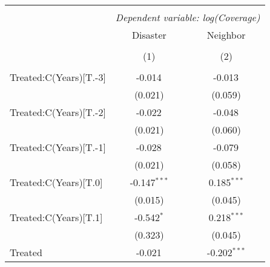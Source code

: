 
\begin{tabular}{@{\extracolsep{5pt}}lcc}
    \\[-1.8ex]\hline
    \hline                                                                                                           \\[-1.8ex]
                           & \multicolumn{2}{c}{\textit{Dependent variable: log(Coverage)}} \
    \cr \cline{2-3}
    \\[-1.8ex] & \multicolumn{1}{c}{Disaster} & \multicolumn{1}{c}{Neighbor}  \\
    \\[-1.8ex] & (1) & (2) \\
    \hline                                                                                                           \\[-1.8ex]
    Treated:C(Years)[T.-3] & -0.014$^{}$                                                          & -0.013$^{}$      \\
                           & (0.021)                                                              & (0.059)          \\
    Treated:C(Years)[T.-2] & -0.022$^{}$                                                          & -0.048$^{}$      \\
                           & (0.021)                                                              & (0.060)          \\
    Treated:C(Years)[T.-1] & -0.028$^{}$                                                          & -0.079$^{}$      \\
                           & (0.021)                                                              & (0.058)          \\
    Treated:C(Years)[T.0]  & -0.147$^{***}$                                                       & 0.185$^{***}$    \\
                           & (0.015)                                                              & (0.045)          \\
    Treated:C(Years)[T.1]  & -0.542$^{*}$                                                         & 0.218$^{***}$    \\
                           & (0.323)                                                              & (0.045)          \\
    Treated                & -0.021$^{}$                                                          & -0.202$^{***}$   \\

\end{tabular}
